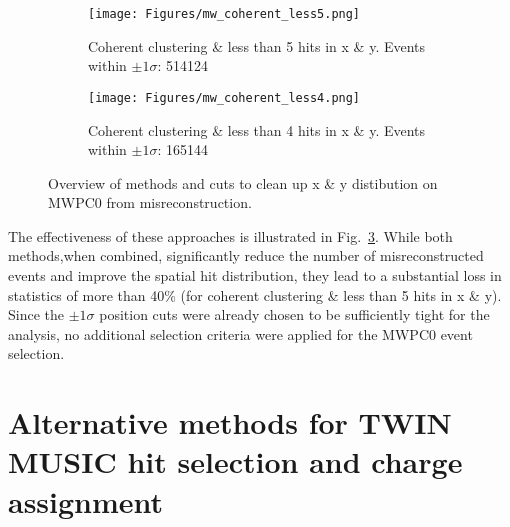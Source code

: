 \begin{appendices}
\begin{figure}
\begin{subfigure}{.45\textwidth}
  \centering
  \texttt{[image: Figures/mw\_coherent\_less5.png]}
  \caption{Coherent clustering \& less than 5 hits in x \& y. Events within $\pm1\sigma$: 514124}
  \label{fig:sub-third}
\end{subfigure}
\begin{subfigure}{.45\textwidth}
  \centering
  \texttt{[image: Figures/mw\_coherent\_less4.png]}
  \caption{Coherent clustering \& less than 4 hits in x \& y. Events within $\pm1\sigma$\protect\footnotemark: 165144}
  \label{fig:sub-fourth}
\end{subfigure}
\caption{Overview of methods and cuts to clean up x \& y distibution on MWPC0 from misreconstruction.}
\label{fig:mw0_approaches}
\end{figure}
The effectiveness of these approaches is illustrated in Fig.~\ref{fig:mw0_approaches}. While both methods,when combined, significantly reduce the number of misreconstructed events and improve the spatial hit distribution, they lead to a substantial loss in statistics of more than 40\% (for coherent clustering \& less than 5 hits in x \& y).\newline
Since the $\pm1\sigma$ position cuts were already chosen to be sufficiently tight for the analysis, no additional selection criteria were applied for the MWPC0 event selection.


\section {Alternative methods for TWIN MUSIC hit selection and charge assignment} \label{app:twin_alternative}


\end{appendices}
